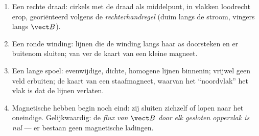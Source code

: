 \begin{proposition}[Veldkaarten]\label{prop:b1:magnetostatics:maps}
\begin{enumerate}
  \item Een rechte draad: cirkels met de draad als middelpunt, in vlakken
        loodrecht erop, georiënteerd volgens de \emph{rechterhandregel}
        (duim langs de stroom, vingers langs $\vect B$).
  \item Een ronde winding: lijnen die de winding langs haar as doorsteken en
        er buitenom sluiten; van ver de kaart van een kleine magneet.
  \item Een lange spoel: evenwijdige, dichte, homogene lijnen binnenin; vrijwel
        geen veld erbuiten; de kaart van een staafmagneet, waarvan het ``noordvlak''
        het vlak is dat de lijnen verlaten.
  \item Magnetische  hebben begin noch eind: zij sluiten zichzelf
        of lopen naar het oneindige. Gelijkwaardig: de \emph{flux van
        $\vect B$ door elk gesloten oppervlak is nul} --- er bestaan geen
        magnetische ladingen.
\end{enumerate}
\end{proposition}
\admitted

